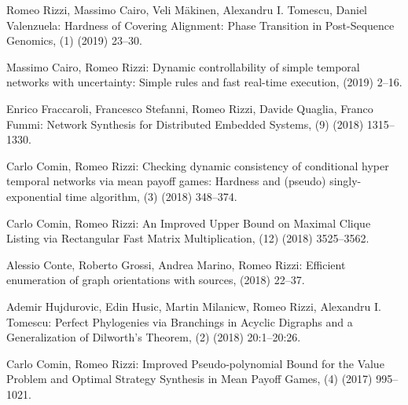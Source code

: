 \begin{etaremune}
  \item {\sc Romeo Rizzi, Massimo Cairo, Veli Mäkinen, Alexandru I. Tomescu, Daniel Valenzuela:}
   \newblock Hardness of Covering Alignment: Phase Transition in Post-Sequence Genomics,
   (1) (2019) 23--30.

  \item {\sc Massimo Cairo, Romeo Rizzi:}
   \newblock Dynamic controllability of simple temporal networks with uncertainty: Simple rules and fast real-time execution,
    (2019) 2--16.

  \item {\sc Enrico Fraccaroli, Francesco Stefanni, Romeo Rizzi, Davide Quaglia, Franco Fummi:}
   \newblock Network Synthesis for Distributed Embedded Systems,
   (9) (2018) 1315--1330.

  \item {\sc Carlo Comin, Romeo Rizzi:}
   \newblock Checking dynamic consistency of conditional hyper temporal networks via mean payoff games: Hardness and (pseudo) singly-exponential time algorithm,
   (3) (2018) 348--374.

  \item {\sc Carlo Comin, Romeo Rizzi:}
    \newblock An Improved Upper Bound on Maximal Clique Listing via Rectangular Fast Matrix Multiplication,
    (12) (2018) 3525--3562.
   
  \item {\sc Alessio Conte, Roberto Grossi, Andrea Marino, Romeo Rizzi:}
   \newblock Efficient enumeration of graph orientations with sources,
    (2018) 22--37.

  \item {\sc Ademir Hujdurovic, Edin Husic, Martin Milanicw, Romeo Rizzi, Alexandru I. Tomescu:}
   \newblock Perfect Phylogenies via Branchings in Acyclic Digraphs and a Generalization of Dilworth's Theorem,
   (2) (2018) 20:1--20:26.

  \item {\sc Carlo Comin, Romeo Rizzi:}
   \newblock Improved Pseudo-polynomial Bound for the Value Problem and Optimal Strategy Synthesis in Mean Payoff Games,
   (4) (2017) 995--1021.


\end{etaremune}
